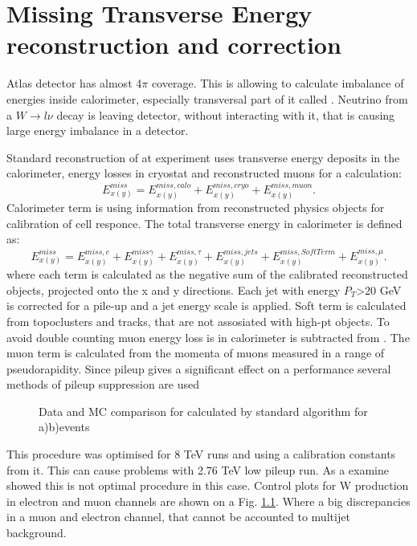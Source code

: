 \chapter{Missing Transverse Energy reconstruction and correction}
Atlas detector has almost 4$\pi$ coverage. This is allowing to calculate imbalance of energies inside calorimeter, especially transversal part of it called \etmiss.  Neutrino from a $W \to l\nu$ decay is leaving detector, without interacting with it, that is causing large energy imbalance in a detector. 

Standard reconstruction of \etmiss at \atlas experiment uses transverse energy deposits in the calorimeter, energy losses in cryostat and reconstructed muons for a calculation:
\begin{equation}
E_{x(y)}^{miss} = E_{x(y)}^{miss, calo} +  E_{x(y)}^{miss, cryo} +  E_{x(y)}^{miss, muon}.
\end{equation}
Calorimeter term is using information from reconstructed physics objects for calibration of cell responce. The total transverse energy in calorimeter is defined as:
\begin{equation}
E_{x(y)}^{miss} = E_{x(y)}^{miss, e} + E_{x(y)}^{miss \gamma} + E_{x(y)}^{miss, \tau} + E_{x(y)}^{miss, jets} + E_{x(y)}^{miss,SoftTerm} + E_{x(y)}^{miss, \mu}.
\end{equation}
where each term is calculated as the negative sum of the calibrated reconstructed objects, projected onto the x and y directions. Each jet with energy $P_T$>20 GeV is corrected for a pile-up and a jet energy scale is applied. Soft term is calculated from topoclusters and tracks, that are not assosiated with high-pt objects. To avoid double counting muon energy loss is in calorimeter is  subtracted from \etmiss.  The \etmiss muon term is calculated from the momenta of muons measured in a range of pseudorapidity. Since pileup gives a significant effect on a \etmiss performance several methods of pileup suppression are used
\begin{figure}[b]
\begin{minipage}[h]{0.49\linewidth}
\end{minipage}
\hfill
\begin{minipage}[h]{0.49\linewidth}
\end{minipage}
\caption{Data and MC comparison for \etmiss calculated by standard \atlas algorithm for a)\wenu b)\wmunu events}
\label{ris:EtMissRefFinal}
\end{figure}
This procedure was optimised for 8 TeV runs  and using a calibration constants from it. This can cause problems with 2.76 TeV low pileup run. As a examine showed this is not optimal procedure in this case. Control plots for W production in electron and muon channels are shown on a  Fig. \ref{ris:EtMissRefFinal}. Where a big discrepancies in a muon and electron channel, that cannot be accounted to multijet background. 

